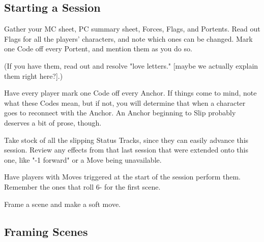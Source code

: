 \documentclass[
  oneside,
  statementpaper,
  9pt]{memoir}
\begin{document}
\hypertarget{starting-a-session-1}{%
\subsection{Starting a Session}\label{starting-a-session-1}}

\begin{MC}

Gather your MC sheet, PC summary sheet, Forces, Flags, and Portents. Read out Flags for all the players’ characters, and note which ones can be changed. Mark one Code off every Portent, and mention them as you do so.

(If you have them, read out and resolve "love letters." [maybe we actually explain them right here?].)

Have every player mark one Code off every Anchor. If things come to mind, note what these Codes mean, but if not, you will determine that when a character goes to reconnect with the Anchor. An Anchor beginning to Slip probably deserves a bit of prose, though.

Take stock of all the slipping Status Tracks, since they can easily advance this session. Review any effects from that last session that were extended onto this one, like "-1 forward" or a Move being unavailable.

Have players with Moves triggered at the start of the session perform them. Remember the ones that roll 6- for the first scene.

Frame a scene and make a soft move.

\end{MC}

\hypertarget{framing-scenes}{%
\subsection{Framing Scenes}\label{framing-scenes}}
\end{document}
